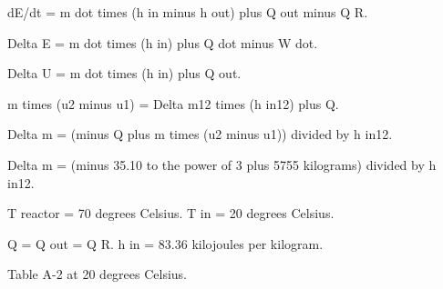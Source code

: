 dE/dt = m dot times (h in minus h out) plus Q out minus Q R.  

Delta E = m dot times (h in) plus Q dot minus W dot.  

Delta U = m dot times (h in) plus Q out.  

m times (u2 minus u1) = Delta m12 times (h in12) plus Q.  

Delta m = (minus Q plus m times (u2 minus u1)) divided by h in12.  

Delta m = (minus 35.10 to the power of 3 plus 5755 kilograms) divided by h in12.  

T reactor = 70 degrees Celsius.  
T in = 20 degrees Celsius.  

Q = Q out = Q R.  
h in = 83.36 kilojoules per kilogram.  

Table A-2 at 20 degrees Celsius.